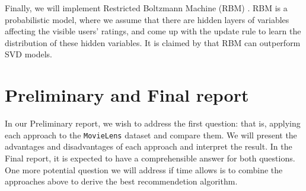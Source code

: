 \documentclass[bj, preprint]{imsart}
\begin{document}
Finally, we will implement Restricted Boltzmann Machine (RBM) \cite{10.1145/1273496.1273596}. RBM is a probabilistic model, where we assume that there are hidden layers of variables affecting the visible users' ratings, and come up with the update rule to learn the distribution of these hidden variables. It is claimed by \cite{10.1145/1273496.1273596} that RBM can outperform SVD models. 


\section{Preliminary and Final report}\label{sec:report}
In our Preliminary report, we wish to address the first question: that is, applying each approach to the \texttt{MovieLens} dataset and compare them. We will present the advantages and disadvantages of each approach and interpret the result. In the Final report, it is expected to have a comprehensible answer for both questions. One more potential question we will address if time allows is to combine the approaches above to derive the best recommendetion algorithm. 


{}
\end{document}
